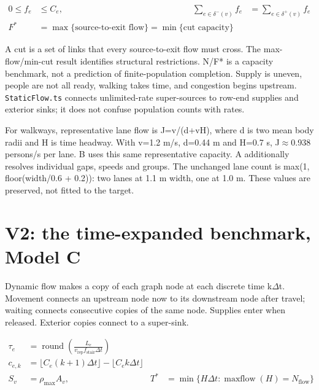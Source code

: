 \documentclass[11pt,a4paper]{article}
\newcommand{\code}[1]{{\small\nolinkurl{#1}}}
\begin{document}
\begin{equation}
\begin{aligned}
0\le f_e&\le C_e, & \sum_{e\in\delta^-(v)}f_e&=\sum_{e\in\delta^+(v)}f_e \\
F^*&=\max\{\text{source-to-exit flow}\}=\min\{\text{cut capacity}\}
\end{aligned}
\tag{3}\label{eq:3}
\end{equation}

A cut is a set of links that every source-to-exit flow must cross. The max-flow/min-cut result \cite{R1} identifies structural restrictions. N/F* is a capacity benchmark, not a prediction of finite-population completion. Supply is uneven, people are not all ready, walking takes time, and congestion begins upstream. \code{StaticFlow.ts} connects unlimited-rate super-sources to row-end supplies and exterior sinks; it does not confuse population counts with rates.


For walkways, representative lane flow is J=v/(d+vH), where d is two mean body radii and H is time headway. With v=1.2 m/s, d=0.44 m and H=0.7 s, J\ensuremath{\approx}0.938 persons/s per lane. B uses this same representative capacity. A additionally resolves individual gaps, speeds and groups. The unchanged lane count is max(1, floor(width/0.6 + 0.2)): two lanes at 1.1 m width, one at 1.0 m. These values are preserved, not fitted to the target.


\section{V2: the time-expanded benchmark, Model C}\label{sec:4}

Dynamic flow \cite{R2} makes a copy of each graph node at each discrete time k\ensuremath{\Delta}t. Movement connects an upstream node now to its downstream node after travel; waiting connects consecutive copies of the same node. Supplies enter when released. Exterior copies connect to a super-sink.


\begin{equation}
\begin{aligned}
\tau_e &= \operatorname{round}\!\left(\frac{L_e}{v_{\mathrm{rep}}f_{\mathrm{stair}}\Delta t}\right) \\
c_{e,k} &= \lfloor C_e(k+1)\Delta t\rfloor-\lfloor C_e k\Delta t\rfloor \\
S_v &= \rho_{\max}A_v, & T^*&=\min\{H\Delta t:\operatorname{maxflow}(H)=N_{\mathrm{flow}}\}
\end{aligned}
\tag{4}\label{eq:4}
\end{equation}
\end{document}
